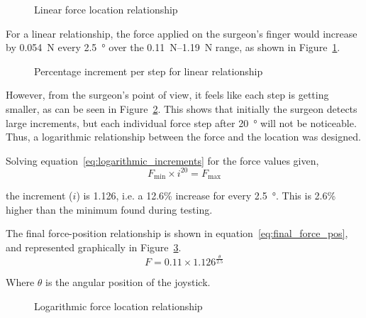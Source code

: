 \begin{figure}
  
  \caption{Linear force location relationship}
  \label{fig:linear_force_location}
\end{figure}

For a linear relationship, the force applied on the surgeon's finger would increase by \SI{0.054}{\newton} every \SI{2.5}{\degree} over the \SIrange{0.11}{1.19}{\newton} range, as shown in Figure~\ref{fig:linear_force_location}.

\begin{figure}
  
  \caption{Percentage increment per step for linear relationship}
  \label{fig:percentage_increment_linear}
\end{figure}

However, from the surgeon's point of view, it feels like each step is getting smaller, as can be seen in Figure~\ref{fig:percentage_increment_linear}.
This shows that initially the surgeon detects large increments, but each individual force step after \SI{20}{\degree} will not be noticeable.
Thus, a logarithmic relationship between the force and the location was designed.

Solving equation~\ref{eq:logarithmic_increments} for the force values given,
\\
\begin{equation}
  F_{\text{min}} \times i^{20} = F_{\text{max}}
  \label{eq:logarithmic_increments}
\end{equation}

the increment ($i$) is 1.126, i.e. a 12.6\% increase for every \SI{2.5}{\degree}.
This is 2.6\% higher than the minimum found during testing.

The final force-position relationship is shown in equation~\ref{eq:final_force_pos}, and represented graphically in Figure~\ref{fig:logarithmic_force_location}.
\\
\begin{equation}
  F = 0.11 \times 1.126^{\frac{\theta}{2.5}}
  \label{eq:final_force_pos}
\end{equation}

Where $\theta$ is the angular position of the joystick.

\begin{figure}[hb]
  
  \caption{Logarithmic force location relationship}
  \label{fig:logarithmic_force_location}
\end{figure}

